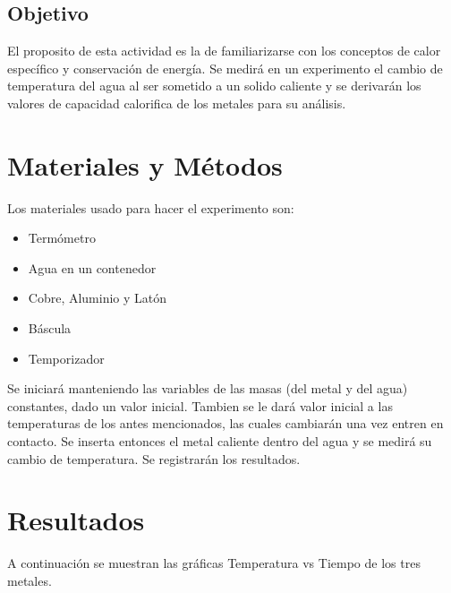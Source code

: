 \documentclass[a4paper,12pt]{article}
\begin{document}
\subsection*{Objetivo}
El proposito de esta actividad es la de familiarizarse con los conceptos de calor específico y conservación de energía. Se medirá en un experimento el cambio de temperatura del agua al ser sometido a un solido caliente y se derivarán los valores de capacidad calorifica de los metales para su análisis.
\\
\section*{Materiales y Métodos}
Los materiales usado para hacer el experimento son:
\begin{itemize}
    \item Termómetro
    \item Agua en un contenedor
    \item Cobre, Aluminio y Latón 
    \item Báscula
    \item Temporizador
\end{itemize}
Se iniciará manteniendo las variables de las masas (del metal y del agua) constantes, dado un valor inicial. Tambien se le dará valor inicial a las temperaturas de los antes mencionados, las cuales cambiarán una vez entren en contacto. Se inserta entonces el metal caliente dentro del agua y se medirá su cambio de temperatura. Se registrarán los resultados.

\section*{Resultados}
A continuación se muestran las gráficas Temperatura vs Tiempo de los tres metales.
\end{document}
